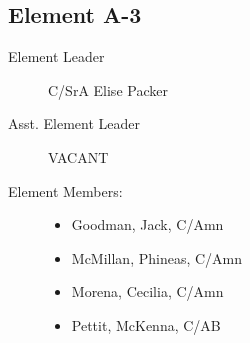 \documentclass[12pt]{article}
\begin{document}
\begin{multicols}{3}
    \columnbreak

    \subsection*{Element A-3}
    \begin{description}
        \item[Element Leader] C/SrA Elise Packer
        \item[Asst. Element Leader] VACANT
        \item[Element Members:]\hfill
        \begin{itemize}
            \item Goodman, Jack, C/Amn
            \item McMillan, Phineas, C/Amn
            \item Morena, Cecilia, C/Amn
            \item Pettit, McKenna, C/AB
        \end{itemize}
    \end{description}
\end{multicols}

\pagebreak
\end{document}
